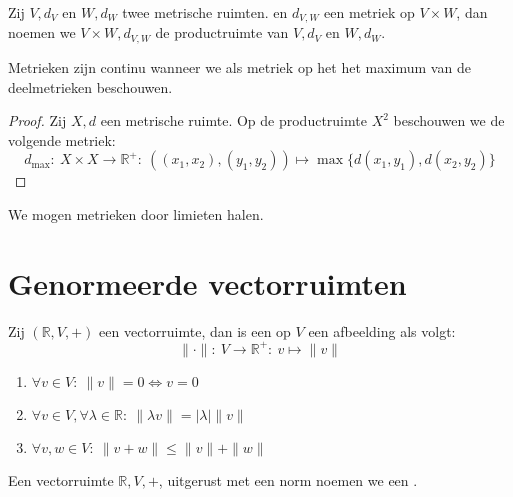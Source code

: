 \documentclass[main.tex]{subfiles}
\begin{document}
\begin{de}
  Zij $V,d_{V}$ en $W,d_{W}$ twee metrische ruimten. en $d_{V,W}$ een metriek op $V\times W$, dan noemen we $V\times W, d_{V,W}$ de productruimte van $V,d_{V}$ en $W,d_{W}$.
\end{de}

\begin{st}
  Metrieken zijn continu wanneer we als metriek op het het maximum van de deelmetrieken beschouwen.
  
  \begin{proof}
    Zij $X,d$ een metrische ruimte.
    Op de productruimte $X^{2}$ beschouwen we de volgende metriek:
    \[ d_{\max}:\ X\times X \rightarrow \mathbb{R}^{+}:\ ((x_{1},x_{2}),(y_{1},y_{2})) \mapsto \max\{ d(x_{1},y_{1}), d(x_{2},y_{2})\} \]
  \end{proof}
\end{st}

\begin{gev}
  \label{gev:metriek-door-limiet}
  We mogen metrieken door limieten halen.
\end{gev}


\section{Genormeerde vectorruimten}
\label{sec:genorm-vect}

\begin{de}
  \label{de:norm}
  Zij $(\mathbb{R},V,+)$ een vectorruimte, dan is een  op $V$ een afbeelding als volgt:
  \[ \|\cdot\|:\ V \rightarrow \mathbb{R}^{+}:\ v \mapsto \|v\| \]
  \begin{enumerate}
  \item $\forall v\in V:\ \|v\| = 0 \Leftrightarrow v=0$
  \item $\forall v\in V, \forall \lambda \in \mathbb{R}:\ \|\lambda v\| = |\lambda|\|v\|$
  \item $\forall v,w\in V:\ \|v+w\| \le \|v\| + \|w\|$
  \end{enumerate}
\end{de}

\begin{de}
  Een vectorruimte $\mathbb{R},V,+$, uitgerust met een norm noemen we een .
\end{de}
\end{document}
